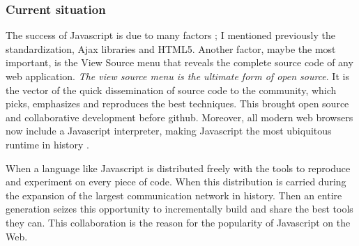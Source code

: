 \subsubsection{Current situation}



The success of Javascript is due to many factors ; I mentioned previously the standardization, Ajax libraries and HTML5.
Another factor, maybe the most important, is the View Source menu that reveals the complete source code of any web application.
\textit{The view source menu is the ultimate form of open source}.
It is the vector of the quick dissemination of source code to the community, which picks, emphasizes and reproduces the best techniques.
This brought open source and collaborative development before github. 
Moreover, all modern web browsers now include a Javascript interpreter, making Javascript the most ubiquitous runtime in history \cite{Flanagan2006}.

When a language like Javascript is distributed freely with the tools to reproduce and experiment on every piece of code.
When this distribution is carried during the expansion of the largest communication network in history.
Then an entire generation seizes this opportunity to incrementally build and share the best tools they can.
This collaboration is the reason for the popularity of Javascript on the Web.




